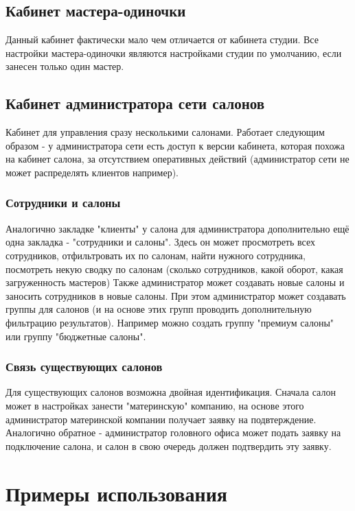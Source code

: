 \documentclass[DIV=calc, paper=a4, fontsize=11pt]{scrartcl} %
\begin{document}
\subsection{Кабинет мастера-одиночки}
Данный кабинет фактически мало чем отличается от кабинета студии. Все настройки мастера-одиночки являются настройками студии по умолчанию, если занесен только один мастер.

\subsection{Кабинет администратора сети салонов}
Кабинет для управления сразу несколькими салонами. Работает следующим образом - у администратора сети есть доступ к версии кабинета, которая похожа на кабинет салона, за отсутствием оперативных действий (администратор сети не может распределять клиентов например). 

\subsubsection{Сотрудники и салоны}
Аналогично закладке "клиенты" у салона для администратора дополнительно ещё одна закладка - "сотрудники и салоны". Здесь он может просмотреть всех сотрудников, отфильтровать их по салонам, найти нужного сотрудника, посмотреть некую сводку по салонам (сколько сотрудников, какой оборот, какая загруженность мастеров) 
Также администратор может создавать новые салоны и заносить сотрудников в новые салоны. При этом администратор может создавать группы для салонов (и на основе этих групп проводить дополнительную фильтрацию результатов). Например можно создать группу "премиум салоны" или группу "бюджетные салоны".

\subsubsection{Связь существующих салонов}
Для существующих салонов возможна двойная идентификация. Сначала салон может в настройках занести "материнскую" компанию, на основе этого администратор материнской компании получает заявку на подвтерждение. Аналогично обратное - администратор головного офиса может подать заявку на подключение салона, и салон в свою очередь должен подтвердить эту заявку.


\section{Примеры использования}
\end{document}

